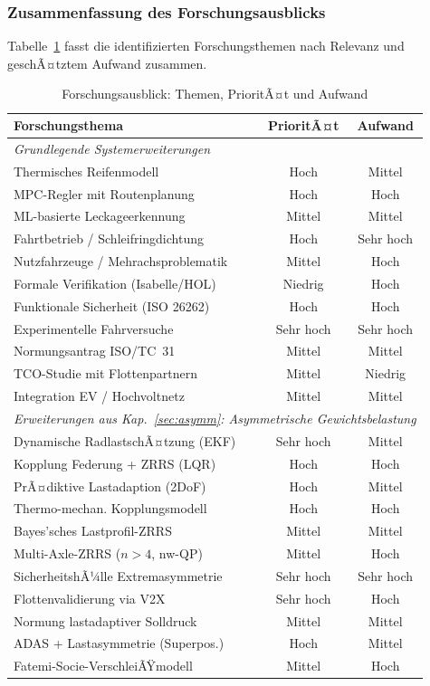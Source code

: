 ﻿\documentclass[a4paper,12pt]{article}
\theoremstyle{definition}
\begin{document}
\subsubsection{Zusammenfassung des Forschungsausblicks}

Tabelle~\ref{tab:forschungsausblick} fasst die identifizierten
Forschungsthemen nach Relevanz und geschÃ¤tztem Aufwand zusammen.

\begin{table}[H]
\centering
\caption{Forschungsausblick: Themen, PrioritÃ¤t und Aufwand}
\label{tab:forschungsausblick}
\begin{tabular}{p{5.5cm}cc}
\toprule
\textbf{Forschungsthema} & \textbf{PrioritÃ¤t} & \textbf{Aufwand} \\
\midrule
\multicolumn{3}{l}{\textit{Grundlegende Systemerweiterungen}} \\
Thermisches Reifenmodell & Hoch & Mittel \\
MPC-Regler mit Routenplanung & Hoch & Hoch \\
ML-basierte Leckageerkennung & Mittel & Mittel \\
Fahrtbetrieb / Schleifringdichtung & Hoch & Sehr hoch \\
Nutzfahrzeuge / Mehrachsproblematik & Mittel & Hoch \\
Formale Verifikation (Isabelle/HOL) & Niedrig & Hoch \\
Funktionale Sicherheit (ISO 26262) & Hoch & Hoch \\
Experimentelle Fahrversuche & Sehr hoch & Sehr hoch \\
Normungsantrag ISO/TC~31 & Mittel & Mittel \\
TCO-Studie mit Flottenpartnern & Mittel & Niedrig \\
Integration EV / Hochvoltnetz & Mittel & Mittel \\
\midrule
\multicolumn{3}{l}{\textit{Erweiterungen aus Kap.~\ref{sec:asymm}: Asymmetrische Gewichtsbelastung}} \\
Dynamische RadlastschÃ¤tzung (EKF) & Sehr hoch & Mittel \\
Kopplung Federung + ZRRS (LQR) & Hoch & Hoch \\
PrÃ¤diktive Lastadaption (2DoF) & Hoch & Mittel \\
Thermo-mechan. Kopplungsmodell & Hoch & Hoch \\
Bayes'sches Lastprofil-ZRRS & Mittel & Mittel \\
Multi-Axle-ZRRS ($n > 4$, nw-QP) & Mittel & Hoch \\
SicherheitshÃ¼lle Extremasymmetrie & Sehr hoch & Sehr hoch \\
Flottenvalidierung via V2X & Sehr hoch & Hoch \\
Normung lastadaptiver Solldruck & Mittel & Mittel \\
ADAS + Lastasymmetrie (Superpos.) & Hoch & Mittel \\
Fatemi-Socie-VerschleiÃŸmodell & Mittel & Hoch \\
\bottomrule
\end{tabular}
\end{table}
\end{document}
